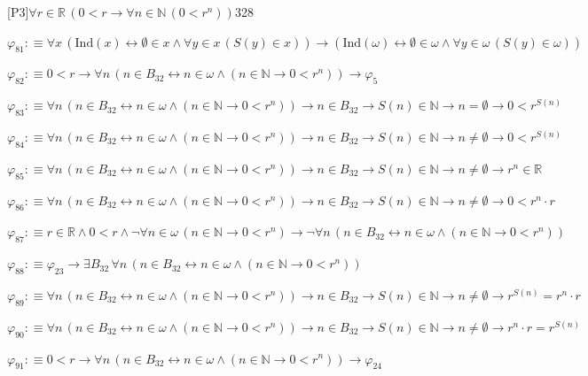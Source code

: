 \begin{fullproof}{[P3]}{$\forall r \in \mathbb{R}\,(0 < r \to \forall n \in \mathbb{N}\,(0 < {{r}^{n}}))$}{328}
\begin{abbrevlist}
\item $\varphi_{81} :\equiv \forall x\,(\mathrm{Ind}(x) \leftrightarrow \emptyset \in x \land \forall y \in x\,(S(y) \in x)) \to (\mathrm{Ind}(\omega) \leftrightarrow \emptyset \in \omega \land \forall y \in \omega\,(S(y) \in \omega))$
\item $\varphi_{82} :\equiv 0 < r \to \forall n\,(n \in B_{32} \leftrightarrow n \in \omega \land (n \in \mathbb{N} \to 0 < {{r}^{n}})) \to \varphi_{5}$
\item $\varphi_{83} :\equiv \forall n\,(n \in B_{32} \leftrightarrow n \in \omega \land (n \in \mathbb{N} \to 0 < {{r}^{n}})) \to n \in B_{32} \to S(n) \in \mathbb{N} \to n = \emptyset \to 0 < {{r}^{S(n)}}$
\item $\varphi_{84} :\equiv \forall n\,(n \in B_{32} \leftrightarrow n \in \omega \land (n \in \mathbb{N} \to 0 < {{r}^{n}})) \to n \in B_{32} \to S(n) \in \mathbb{N} \to n \neq \emptyset \to 0 < {{r}^{S(n)}}$
\item $\varphi_{85} :\equiv \forall n\,(n \in B_{32} \leftrightarrow n \in \omega \land (n \in \mathbb{N} \to 0 < {{r}^{n}})) \to n \in B_{32} \to S(n) \in \mathbb{N} \to n \neq \emptyset \to {{r}^{n}} \in \mathbb{R}$
\item $\varphi_{86} :\equiv \forall n\,(n \in B_{32} \leftrightarrow n \in \omega \land (n \in \mathbb{N} \to 0 < {{r}^{n}})) \to n \in B_{32} \to S(n) \in \mathbb{N} \to n \neq \emptyset \to 0 < {{r}^{n}} \cdot r$
\item $\varphi_{87} :\equiv r \in \mathbb{R} \land 0 < r \land \neg \forall n \in \omega\,(n \in \mathbb{N} \to 0 < {{r}^{n}}) \to \neg \forall n\,(n \in B_{32} \leftrightarrow n \in \omega \land (n \in \mathbb{N} \to 0 < {{r}^{n}}))$
\item $\varphi_{88} :\equiv \varphi_{23} \to \exists B_{32}\,\forall n\,(n \in B_{32} \leftrightarrow n \in \omega \land (n \in \mathbb{N} \to 0 < {{r}^{n}}))$
\item $\varphi_{89} :\equiv \forall n\,(n \in B_{32} \leftrightarrow n \in \omega \land (n \in \mathbb{N} \to 0 < {{r}^{n}})) \to n \in B_{32} \to S(n) \in \mathbb{N} \to n \neq \emptyset \to {{r}^{S(n)}} = {{r}^{n}} \cdot r$
\item $\varphi_{90} :\equiv \forall n\,(n \in B_{32} \leftrightarrow n \in \omega \land (n \in \mathbb{N} \to 0 < {{r}^{n}})) \to n \in B_{32} \to S(n) \in \mathbb{N} \to n \neq \emptyset \to {{r}^{n}} \cdot r = {{r}^{S(n)}}$
\item $\varphi_{91} :\equiv 0 < r \to \forall n\,(n \in B_{32} \leftrightarrow n \in \omega \land (n \in \mathbb{N} \to 0 < {{r}^{n}})) \to \varphi_{24}$

\end{abbrevlist}
\end{fullproof}

